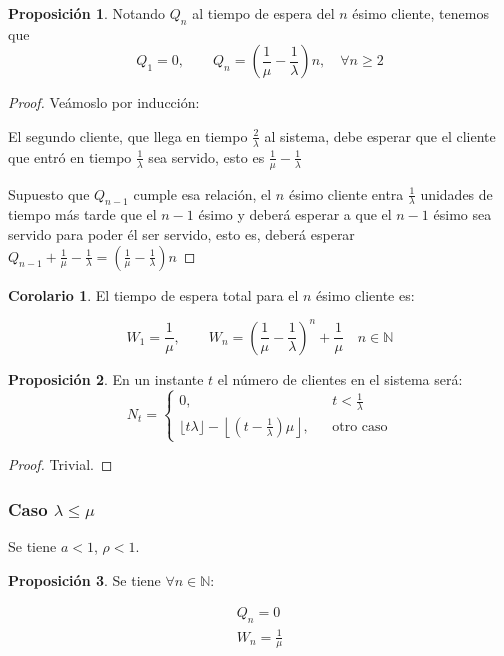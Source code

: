 \documentclass[a4paper,10pt]{scrartcl}
\theoremstyle{definition}
\newtheorem*{fact*}{Proposición}
\newtheorem*{corollary*}{Corolario}
\theoremstyle{definition}
\newtheorem*{fact*}{Proposición}
\newtheorem*{corollary*}{Corolario}
\numberwithin{equation}{section}
\begin{document}
	\begin{fact*}
		Notando $Q_n$ al tiempo de espera del $n$ ésimo cliente, tenemos que \[Q_1 = 0, \qquad Q_n = \left(\frac{1}{\mu} - \frac{1}{\lambda}\right)n, \quad \forall n\ge 2\]
	\end{fact*}
	
	\begin{proof}
		Veámoslo por inducción:
		
		El segundo cliente, que llega en tiempo $\frac{2}{\lambda}$ al sistema, debe esperar que el cliente que entró en tiempo $\frac{1}{\lambda}$ sea servido,
		esto es $\frac{1}{\mu} - \frac{1}{\lambda}$
		
		Supuesto que $Q_{n-1}$ cumple esa relación, el $n$ ésimo cliente entra $\frac{1}{\lambda}$ unidades de tiempo
		más tarde que el $n-1$ ésimo y deberá esperar a que el $n-1$ ésimo sea servido para poder él ser servido, esto es,
		deberá esperar $Q_{n-1} + \frac{1}{\mu} - \frac{1}{\lambda} = \left(\frac{1}{\mu} - \frac{1}{\lambda}\right)n$
	\end{proof}
	
	\begin{corollary*}
		El tiempo de espera total para el $n$ ésimo cliente es:
		
		\[W_1 = \frac{1}{\mu}, \qquad W_n = \left(\frac{1}{\mu} - \frac{1}{\lambda}\right)^n + \frac{1}{\mu} \quad n\in \mathbb{N}\]
	\end{corollary*}
	
	\begin{fact*}
		En un instante $t$ el número de clientes en el sistema será: 
		\[N_t = \left\{\begin{array}{lcc}
		0, && t < \frac{1}{\lambda}\\
		\lfloor t\lambda \rfloor - \left\lfloor\left(t-\frac{1}{\lambda}\right)\mu\right\rfloor, && \text{otro caso}
		\end{array}\right.\]
	\end{fact*}
	
	\begin{proof}
		Trivial.
	\end{proof}
	
	
	\subsubsection{Caso $\lambda \le \mu$}
	
	Se tiene $a < 1$, $\rho < 1$.
	
	\begin{fact*}
		Se tiene $\forall n\in \mathbb{N}$:
		
		\begin{align*}
		Q_n = 0\\
		W_n = \frac{1}{\mu}
		\end{align*}
	\end{fact*}
	
\end{document}
